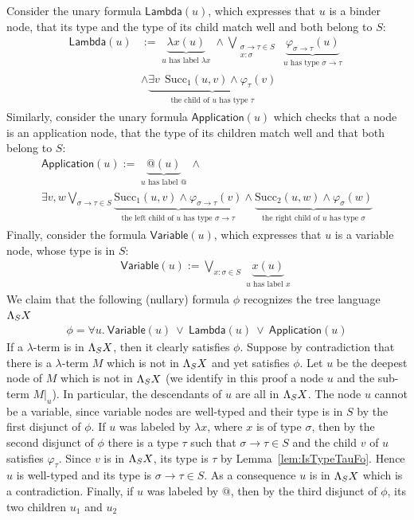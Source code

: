 Consider the unary formula $\mathsf{Lambda}(u)$, which expresses that $u$ is a binder node, that its type and the type of its child match well and both belong to $S$: 
$$\begin{array}{ll}
\mathsf{Lambda}(u) &:= \underbrace{\lambda x(u)}_{\substack{\text{$u$ has label $\lambda x$}}} \wedge\bigvee_{\substack{\sigma\rightarrow\tau \in S\\x:\sigma}}  \underbrace{\varphi_{\sigma\rightarrow\tau}(u)}_{\substack{\text{$u$ has type $\sigma\rightarrow\tau$}}}  \\ & \wedge \underbrace{\exists v\ \ \mathrm{Succ}_1(u, v) \wedge \varphi_\tau (v)}_{\substack{\text{the child of $u$ has type $\tau$}}}
\end{array}$$
Similarly, consider the unary formula $\mathsf{Application}(u)$ which checks that a node is an application node, that the type of its children match well and that both belong to $S$: 
$$\begin{array}{l}
\mathsf{Application}(u) := \underbrace{@(u)}_{\substack{\text{$u$ has label @}}} \wedge \\ \exists v, w \underset{\sigma\rightarrow\tau \in S}{\bigvee}  \underbrace{\mathrm{Succ}_1(u, v) \wedge \varphi_{\sigma\rightarrow\tau} (v)}_{\substack{\text{the left child of $u$ has type $\sigma\rightarrow\tau$}}} \wedge \underbrace{\mathrm{Succ}_2(u, w) \wedge \varphi_{\sigma} (w)}_{\substack{\text{the right child of $u$ has type $\sigma$}}}
\end{array}$$
Finally, consider the formula $\mathsf{Variable}(u)$, which expresses that $u$ is a variable node, whose type is in $S$:
\begin{align*}
\mathsf{Variable}(u) :=  \bigvee_{x:\sigma\in S}\underbrace{x(u)}_{\substack{\text{$u$ has label $x$}}} 
\end{align*}  
We claim that the following (nullary) formula $\phi$ recognizes the tree language $\Lambda_{S} X$
\begin{align*}
\phi = \forall u.\ \mathsf{Variable}(u)\ \vee\ \mathsf{Lambda}(u)\ \vee\  \mathsf{Application}(u)
\end{align*}
If a $\lambda$-term is in $\Lambda_{S} X$, then it clearly satisfies $\phi$. Suppose by contradiction that there is a $\lambda$-term $M$ which is not in $\Lambda_{S} X$ and yet satisfies $\phi$. Let $u$  be the deepest node of $M$ which is not in $\Lambda_{S} X$ (we identify in this proof a node $u$ and the sub-term $M|_u$). In particular, the descendants of $u$ are all in $\Lambda_{S} X$. The node $u$ cannot be a variable, since variable nodes are well-typed and their type is in $S$ by the first disjunct of $\phi$.  If $u$ was labeled by $\lambda x$, where $x$ is of type $\sigma$, then by the second disjunct of $\phi$ there is a type $\tau$ such that $\sigma\rightarrow\tau\in S$ and the child $v$ of $u$  satisfies $\varphi_\tau$. Since $v$ is in $\Lambda_{S} X$, its type is $\tau$ by Lemma~\ref{lem:IsTypeTauFo}. Hence $u$ is well-typed and its type is $\sigma\rightarrow\tau\in S$. As a consequence $u$ is in $\Lambda_{S} X$ which is a contradiction.  Finally, if $u$ was labeled by $@$, then by the third disjunct of $\phi$, its two children $u_1$ and $u_2$
